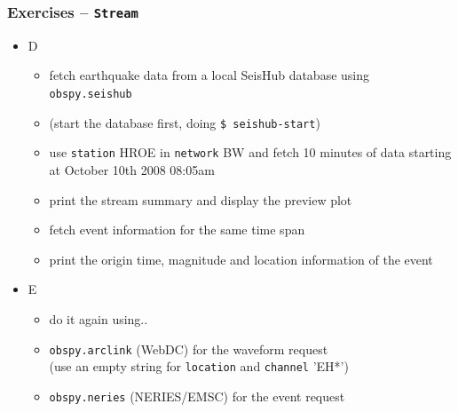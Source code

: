 \documentclass[t,10pt,compress=false,usepdftitle=false]{beamer}
\begin{document}
\begin{frame}[fragile]
    \frametitle{Exercises -- \tt{Stream}}
    \begin{itemize}
    \item D
        \begin{itemize}
        \item fetch earthquake data from a local SeisHub database using \verb#obspy.seishub#
        \item (start the database first, doing \verb#$ seishub-start#)
        \item use \verb#station# HROE in \verb#network# BW and fetch 10 minutes of data starting at October 10th 2008 08:05am
        \item print the stream summary and display the preview plot
        \item fetch event information for the same time span
        \item print the origin time, magnitude and location information of the event
        \end{itemize}
    \end{itemize}
    \vspace*{0.5em}
    \begin{itemize}
    \item<2> E
        \begin{itemize}
        \item<2> do it again using..
        \item<2> \verb#obspy.arclink# (WebDC) for the waveform request\\
                 (use an empty string for \verb#location# and \verb#channel# 'EH*')
        \item<2> \verb#obspy.neries# (NERIES/EMSC) for the event request
        \end{itemize}
    \end{itemize}
\end{frame}

\end{document}
